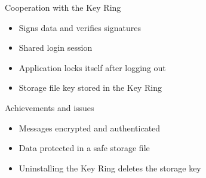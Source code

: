 \documentclass{beamer}
\newcommand*\tick{\item[\ding{51}]}
\newcommand*\fail{\item[\ding{55}]}
\begin{document}

\begin{frame}{Cooperation with the Key Ring}
	\begin{itemize}
		\item{Signs data and verifies signatures}
		\item{Shared login session}
		\item{Application locks itself after logging out}
		\item{Storage file key stored in the Key Ring}
	\end{itemize}
\end{frame}


\begin{frame}{Achievements and issues}
	\begin{itemize}
		\tick Messages encrypted and authenticated
		\tick Data protected in a safe storage file
		\fail Uninstalling the Key Ring deletes the storage key
 	\end{itemize}
\end{frame}
\end{document}
